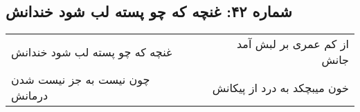 \begin{center}
\section*{شماره ۴۲: غنچه که چو پسته لب شود خندانش}
\label{sec:042}
\begin{longtable}{l p{0.5cm} r}
غنچه که چو پسته لب شود خندانش
&&
از کم عمری بر لبش آمد جانش
\\
چون نیست به جز نیست شدن درمانش
&&
خون میبچکد به درد از پیکانش
\\
\end{longtable}
\end{center}
